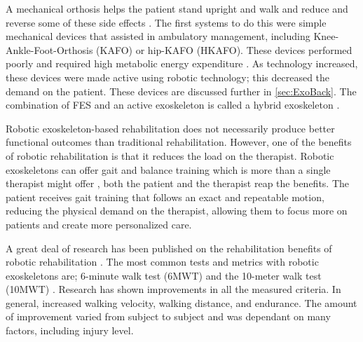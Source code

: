 A mechanical orthosis helps the patient stand upright and walk and reduce and reverse some of these side effects \cite{palermo2017clinician}. The first systems to do this were simple mechanical devices that assisted in ambulatory management, including Knee-Ankle-Foot-Orthosis (KAFO) or hip-KAFO (HKAFO). These devices performed poorly and required high metabolic energy expenditure \cite{del2012review}. As technology increased, these devices were made active using robotic technology; this decreased the demand on the patient. These devices are discussed further in \autoref{sec:ExoBack}. The combination of FES and an active exoskeleton is called a hybrid exoskeleton \cite{ha2012enhancing} \cite{alouane2019hybrid}. 

Robotic exoskeleton-based rehabilitation does not necessarily produce better functional outcomes than traditional rehabilitation. However, one of the benefits of robotic rehabilitation is that it reduces the load on the therapist. Robotic exoskeletons can offer gait and balance training which is more than a single therapist might offer \cite{guidingLeg}, both the patient and the therapist reap the benefits. The patient receives gait training that follows an exact and repeatable motion, reducing the physical demand on the therapist, allowing them to focus more on patients and create more personalized care.  


A great deal of research has been published on the rehabilitation benefits of robotic rehabilitation \cite{esquenazi2012rewalk} \cite{zeilig2012safety} \cite{6876184}. The most common tests and metrics with robotic exoskeletons are; 6-minute walk test (6MWT) and the 10-meter walk test (10MWT) \cite{amatachaya2014concurrent}. Research has shown improvements in all the measured criteria. In general, increased walking velocity, walking distance, and endurance. The amount of improvement varied from subject to subject and was dependant on many factors, including injury level.   